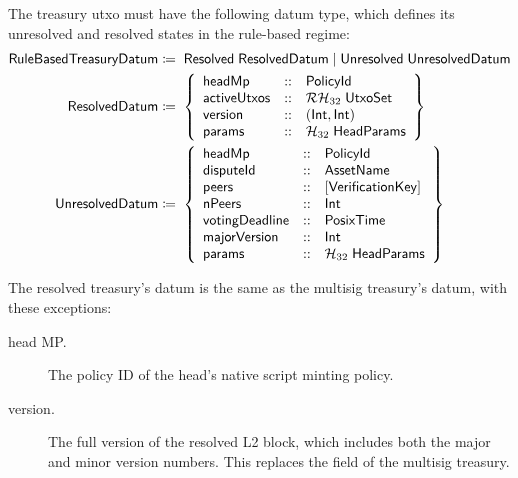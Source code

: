 \documentclass[../hydrozoa.tex]{subfiles}
\begin{document}
The treasury utxo must have the following datum type, which defines its unresolved and resolved states in the rule-based regime:
\begin{equation*}
\begin{split}
  \mathsf{RuleBasedTreasuryDatum} &\coloneq\;
    \mathsf{Resolved} \; \mathsf{ResolvedDatum} \mid
    \mathsf{Unresolved} \; \mathsf{UnresolvedDatum} \\
  \mathsf{ResolvedDatum} &\coloneq\;\left\{
    \begin{array}{lll}
      \mathsf{headMp} &::& \mathsf{PolicyId} \\
      \mathsf{activeUtxos}  &::& \mathcal{RH}_{32} \; \mathsf{UtxoSet} \\
      \mathsf{version} &::& (\mathsf{Int}, \mathsf{Int}) \\
      \mathsf{params} &::& \mathcal{H}_{32} \; \mathsf{HeadParams}
    \end{array}\right\} \\
  \mathsf{UnresolvedDatum} &\coloneq\;\left\{
    \begin{array}{lll}
      \mathsf{headMp} &::& \mathsf{PolicyId} \\
      \mathsf{disputeId} &::& \mathsf{AssetName} \\
      \mathsf{peers} &::& \mathsf{[VerificationKey]} \\
      \mathsf{nPeers} &::& \mathsf{Int} \\
      \mathsf{votingDeadline} &::& \mathsf{PosixTime} \\
      \mathsf{majorVersion} &::& \mathsf{Int} \\
      \mathsf{params} &::& \mathcal{H}_{32} \; \mathsf{HeadParams}
    \end{array}\right\}
\end{split}
\end{equation*}

The resolved treasury's datum is the same as the multisig treasury's datum, with these exceptions:
\begin{description}
  \item[head MP.] The policy ID of the head's native script minting policy.
  \item[version.] The full version of the resolved L2 block, which includes both the major and minor version numbers. This replaces the  field of the multisig treasury.
\end{description}
\end{document}
